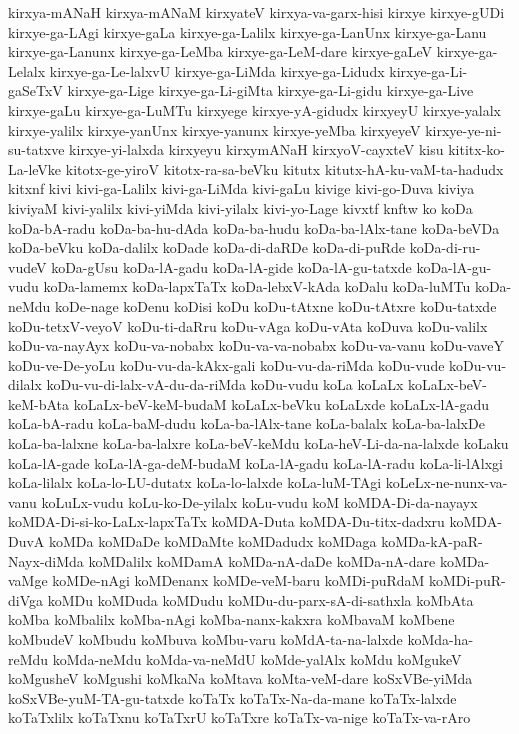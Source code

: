 {kirxya-mANaH
kirxya-mANaM
kirxyateV
kirxya-va-garx-hisi
kirxye
kirxye-gUDi
kirxye-ga-LAgi
kirxye-gaLa
kirxye-ga-Lalilx
kirxye-ga-LanUnx
kirxye-ga-Lanu
kirxye-ga-Lanunx
kirxye-ga-LeMba
kirxye-ga-LeM-dare
kirxye-gaLeV
kirxye-ga-Lelalx
kirxye-ga-Le-lalxvU
kirxye-ga-LiMda
kirxye-ga-Lidudx
kirxye-ga-Li-gaSeTxV
kirxye-ga-Lige
kirxye-ga-Li-giMta
kirxye-ga-Li-gidu
kirxye-ga-Live
kirxye-gaLu
kirxye-ga-LuMTu
kirxyege
kirxye-yA-gidudx
kirxyeyU
kirxye-yalalx
kirxye-yalilx
kirxye-yanUnx
kirxye-yanunx
kirxye-yeMba
kirxyeyeV
kirxye-ye-ni-su-tatxve
kirxye-yi-lalxda
kirxyeyu
kirxymANaH
kirxyoV-cayxteV
kisu
kititx-ko-La-leVke
kitotx-ge-yiroV
kitotx-ra-sa-beVku
kitutx
kitutx-hA-ku-vaM-ta-hadudx
kitxnf
kivi
kivi-ga-Lalilx
kivi-ga-LiMda
kivi-gaLu
kivige
kivi-go-Duva
kiviya
kiviyaM
kivi-yalilx
kivi-yiMda
kivi-yilalx
kivi-yo-Lage
kivxtf
knftw
ko
koDa
koDa-bA-radu
koDa-ba-hu-dAda
koDa-ba-hudu
koDa-ba-lAlx-tane
koDa-beVDa
koDa-beVku
koDa-dalilx
koDade
koDa-di-daRDe
koDa-di-puRde
koDa-di-ru-vudeV
koDa-gUsu
koDa-lA-gadu
koDa-lA-gide
koDa-lA-gu-tatxde
koDa-lA-gu-vudu
koDa-lamemx
koDa-lapxTaTx
koDa-lebxV-kAda
koDalu
koDa-luMTu
koDa-neMdu
koDe-nage
koDenu
koDisi
koDu
koDu-tAtxne
koDu-tAtxre
koDu-tatxde
koDu-tetxV-veyoV
koDu-ti-daRru
koDu-vAga
koDu-vAta
koDuva
koDu-valilx
koDu-va-nayAyx
koDu-va-nobabx
koDu-va-va-nobabx
koDu-va-vanu
koDu-vaveY
koDu-ve-De-yoLu
koDu-vu-da-kAkx-gali
koDu-vu-da-riMda
koDu-vude
koDu-vu-dilalx
koDu-vu-di-lalx-vA-du-da-riMda
koDu-vudu
koLa
koLaLx
koLaLx-beV-keM-bAta
koLaLx-beV-keM-budaM
koLaLx-beVku
koLaLxde
koLaLx-lA-gadu
koLa-bA-radu
koLa-baM-dudu
koLa-ba-lAlx-tane
koLa-balalx
koLa-ba-lalxDe
koLa-ba-lalxne
koLa-ba-lalxre
koLa-beV-keMdu
koLa-heV-Li-da-na-lalxde
koLaku
koLa-lA-gade
koLa-lA-ga-deM-budaM
koLa-lA-gadu
koLa-lA-radu
koLa-li-lAlxgi
koLa-lilalx
koLa-lo-LU-dutatx
koLa-lo-lalxde
koLa-luM-TAgi
koLeLx-ne-nunx-va-vanu
koLuLx-vudu
koLu-ko-De-yilalx
koLu-vudu
koM
koMDA-Di-da-nayayx
koMDA-Di-si-ko-LaLx-lapxTaTx
koMDA-Duta
koMDA-Du-titx-dadxru
koMDA-DuvA
koMDa
koMDaDe
koMDaMte
koMDadudx
koMDaga
koMDa-kA-paR-Nayx-diMda
koMDalilx
koMDamA
koMDa-nA-daDe
koMDa-nA-dare
koMDa-vaMge
koMDe-nAgi
koMDenanx
koMDe-veM-baru
koMDi-puRdaM
koMDi-puR-diVga
koMDu
koMDuda
koMDudu
koMDu-du-parx-sA-di-sathxla
koMbAta
koMba
koMbalilx
koMba-nAgi
koMba-nanx-kakxra
koMbavaM
koMbene
koMbudeV
koMbudu
koMbuva
koMbu-varu
koMdA-ta-na-lalxde
koMda-ha-reMdu
koMda-neMdu
koMda-va-neMdU
koMde-yalAlx
koMdu
koMgukeV
koMgusheV
koMgushi
koMkaNa
koMtava
koMta-veM-dare
koSxVBe-yiMda
koSxVBe-yuM-TA-gu-tatxde
koTaTx
koTaTx-Na-da-mane
koTaTx-lalxde
koTaTxlilx
koTaTxnu
koTaTxrU
koTaTxre
koTaTx-va-nige
koTaTx-va-rAro
}
